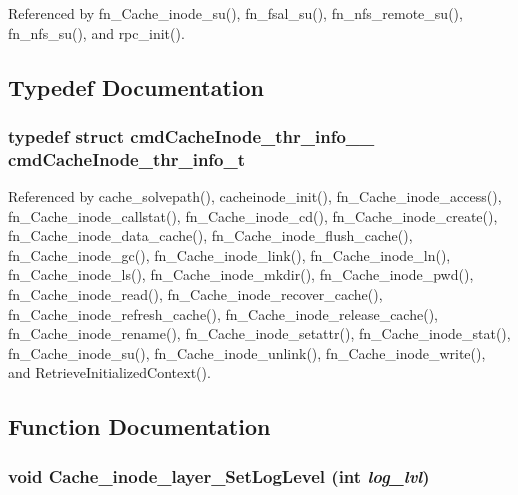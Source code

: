 Referenced by fn\_\-Cache\_\-inode\_\-su(), fn\_\-fsal\_\-su(), fn\_\-nfs\_\-remote\_\-su(), fn\_\-nfs\_\-su(), and rpc\_\-init().

\subsection{Typedef Documentation}
\subsubsection{\setlength{\rightskip}{0pt plus 5cm}typedef struct {\bf cmd\-Cache\-Inode\_\-thr\_\-info\_\-\_\-}  {\bf cmd\-Cache\-Inode\_\-thr\_\-info\_\-t}}\label{commands__Cache__inode_8c_a14}




Referenced by cache\_\-solvepath(), cacheinode\_\-init(), fn\_\-Cache\_\-inode\_\-access(), fn\_\-Cache\_\-inode\_\-callstat(), fn\_\-Cache\_\-inode\_\-cd(), fn\_\-Cache\_\-inode\_\-create(), fn\_\-Cache\_\-inode\_\-data\_\-cache(), fn\_\-Cache\_\-inode\_\-flush\_\-cache(), fn\_\-Cache\_\-inode\_\-gc(), fn\_\-Cache\_\-inode\_\-link(), fn\_\-Cache\_\-inode\_\-ln(), fn\_\-Cache\_\-inode\_\-ls(), fn\_\-Cache\_\-inode\_\-mkdir(), fn\_\-Cache\_\-inode\_\-pwd(), fn\_\-Cache\_\-inode\_\-read(), fn\_\-Cache\_\-inode\_\-recover\_\-cache(), fn\_\-Cache\_\-inode\_\-refresh\_\-cache(), fn\_\-Cache\_\-inode\_\-release\_\-cache(), fn\_\-Cache\_\-inode\_\-rename(), fn\_\-Cache\_\-inode\_\-setattr(), fn\_\-Cache\_\-inode\_\-stat(), fn\_\-Cache\_\-inode\_\-su(), fn\_\-Cache\_\-inode\_\-unlink(), fn\_\-Cache\_\-inode\_\-write(), and Retrieve\-Initialized\-Context().

\subsection{Function Documentation}
\subsubsection{\setlength{\rightskip}{0pt plus 5cm}void Cache\_\-inode\_\-layer\_\-Set\-Log\-Level (int {\em log\_\-lvl})}\label{commands__Cache__inode_8c_a22}




